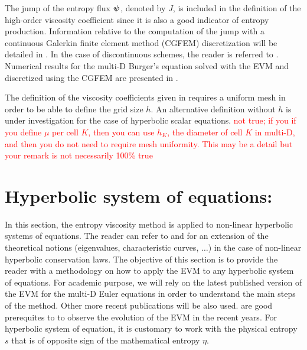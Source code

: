 %
The jump of the entropy flux $\boldsymbol\psi$, denoted by $J$, is included in the definition of the high-order viscosity coefficient since it is also a good indicator of entropy production. Information relative to the computation of the jump with a continuous Galerkin finite element method (CGFEM) discretization will be detailed in . In the case of discontinuous schemes, the reader is referred to \cite{valentin}. Numerical results for the multi-D Burger's equation solved with the EVM  and discretized using the CGFEM are presented in .
%
\begin{remark}
The definition of the viscosity coefficients given in  requires a uniform mesh in order to be able to define the grid size $h$. An alternative definition without $h$ is under investigation for the case of hyperbolic scalar equations.
\textcolor{red}{not true; if you if you define $\mu$ per cell $K$, then you can use $h_K$, the diameter of cell $K$ in multi-D, and then you do not need to require mesh uniformity. This may be a detail but your remark is not necessarily 100\% true}
\end{remark}


\section{Hyperbolic system of equations:}\label{sec:hyp_sect1b}
In this section, the entropy viscosity method is applied to non-linear hyperbolic systems of equations. The reader can refer to \cite{Toro} and \cite{Leveque} for an extension of the theoretical notions (eigenvalues, characteristic curves, $\ldots$) in the case of non-linear hyperbolic conservation laws. The objective of this section is to provide the reader with a methodology on how to apply the EVM to any hyperbolic system of equations. For academic purpose, we will rely on the latest published version of the EVM \cite{valentin} for the multi-D Euler equations in order to understand the main steps of the method. Other more recent publications will be also used. \cite{jlg, jlg2} are good prerequites to \cite{valentin} to observe the evolution of the EVM in the recent years. For hyperbolic system of equation, it is customary to work with the physical entropy $s$ that is of opposite sign of the mathematical entropy $\eta$.\\

